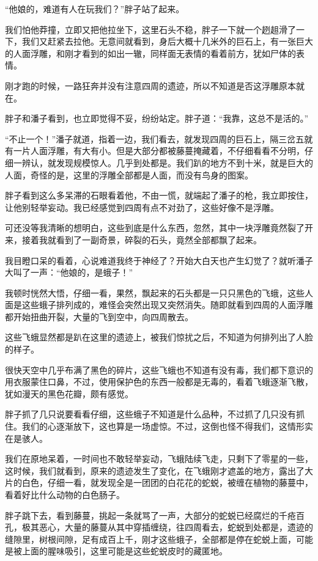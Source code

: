 “他娘的，难道有人在玩我们？”胖子站了起来。

我们怕他莽撞，立即又把他拉坐下，这里石头不稳，胖子一下就一个趔趄滑了一下，我们又赶紧去拉他。无意间就看到，身后大概十几米外的巨石上，有一张巨大的人面浮雕，和刚才看到的如出一辙，同样面无表情的看着前方，犹如尸体的表情。

刚才跑的时候，一路狂奔并没有注意四周的遗迹，所以不知道是否这浮雕原本就在。

胖子和潘子看到，也立即觉得不妥，纷纷站定。胖子道：“我靠，这总不是活的。”

“不止一个！”潘子就道，指着一边，我们看去，就发现四周的巨石上，隔三岔五就有一片人面浮雕，有大有小。但是大部分都被藤蔓掩藏着，不仔细看看不分明，仔细一辨认，就发现规模惊人。几乎到处都是。我们趴的地方不到十米，就是巨大的人面，奇怪的是，这里的浮雕全部都是人面，而没有鸟身的图案。

胖子看到这么多呆滞的石眼看着他，不由一慌，就端起了潘子的枪，我立即按住，让他别轻举妄动。我已经感觉到四周有点不对劲了，这些好像不是浮雕。

可还没等我清晰的想明白，这些到底是什么东西，忽然，其中一块浮雕竟然裂了开来，接着我就看到了一副奇景，碎裂的石头，竟然全部都飘了起来。

我目瞪口呆的看着，心说难道我终于神经了？开始大白天也产生幻觉了？就听潘子大叫了一声：“他娘的，是蛾子！”

我顿时恍然大悟，仔细一看，果然，飘起来的石头都是一只只黑色的飞蛾，这些人面是这些蛾子排列成的，难怪会突然出现又突然消失。随即就看到四周的人面浮雕都开始扭曲开裂，大量的飞到空中，向四周散去。

这些飞蛾显然都是趴在这里的遗迹上，被我们惊扰之后，不知道为何排列出了人脸的样子。

很快天空中几乎布满了黑色的碎片，这些飞蛾也不知道有没有毒，我们都下意识的用衣服蒙住口鼻，不过，使用保护色的东西一般都是无毒的，看着飞蛾逐渐飞散，犹如漫天的黑色花瓣，颇有感觉。

胖子抓了几只说要看看仔细，这些蛾子不知道是什么品种，不过抓了几只没有抓住。我们的心逐渐放下，这也算是一场虚惊。不过，这倒也怪不得我们，这情形实在是骇人。

我们在原地呆着，一时间也不敢轻举妄动，飞蛾陆续飞走，只剩下了零星的一些，这时候，我们就看到，原来的遗迹发生了变化，在飞蛾刚才遮盖的地方，露出了大片的白色，仔细一看，就发现全是一团团的白花花的蛇蜕，被缠在植物的藤蔓中，看着好比什么动物的白色肠子。

胖子跳下去，看到藤蔓，挑起一条就骂了一声，大部分的蛇蜕已经腐烂的千疮百孔，极其恶心，大量的藤蔓从其中穿插缠绕，往四周看去，蛇蜕到处都是，遗迹的缝隙里，树根间隙，足有成百上千，刚才这些蛾子，全部都是停在蛇蜕上面，可能是被上面的腥味吸引，这里可能是这些蛇蜕皮时的藏匿地。

